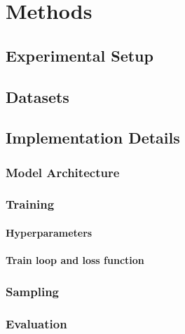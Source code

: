 \chapter{Methods}
\label{ch:methods}

\section{Experimental Setup}
\label{ch:methods-experimentalSetup}
\section{Datasets}
\label{ch:methods-datasets}
\section{Implementation Details}
\label{ch:methods-implementationDetails}

\subsection{Model Architecture}
\label{ch:methods-implementationDetails-modelArchitecture}

\subsection{Training}
\label{ch:methods-implementationDetails-training}

\subsubsection{Hyperparameters}
\label{ch:methods-implementationDetails-training-hyperparameters}

\subsubsection{Train loop and loss function}
\label{ch:methods-implementationDetails-training-trainLoopAndLossFunction}

\subsection{Sampling}
\label{ch:methods-implementationDetails-sampling}

\subsection{Evaluation}
\label{ch:methods-implementationDetails-evaluation}
